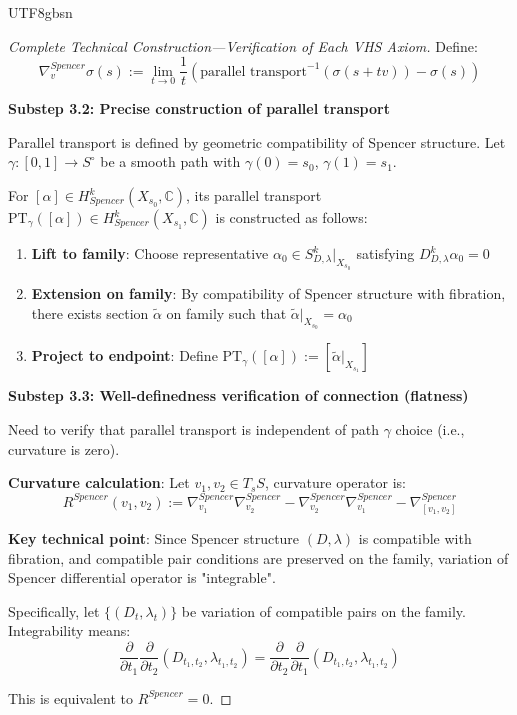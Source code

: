 \documentclass[a4paper,12pt]{extarticle}
\theoremstyle{definition}
\begin{document}
\begin{CJK}{UTF8}{gbsn}
\begin{proof}[Complete Technical Construction—Verification of Each VHS Axiom]
Define:
$$\nabla^{Spencer}_v \sigma(s) := \lim_{t \to 0} \frac{1}{t}\left(\text{parallel transport}^{-1}(\sigma(s+tv)) - \sigma(s)\right)$$

\textbf{Substep 3.2: Precise construction of parallel transport}

Parallel transport is defined by geometric compatibility of Spencer structure. Let $\gamma: [0,1] \to S^\circ$ be a smooth path with $\gamma(0) = s_0$, $\gamma(1) = s_1$.

For $[\alpha] \in H^k_{Spencer}(X_{s_0}, \mathbb{C})$, its parallel transport $\text{PT}_\gamma([\alpha]) \in H^k_{Spencer}(X_{s_1}, \mathbb{C})$ is constructed as follows:

\begin{enumerate}
    \item \textbf{Lift to family}: Choose representative $\alpha_0 \in S^k_{D,\lambda}|_{X_{s_0}}$ satisfying $D^k_{D,\lambda}\alpha_0 = 0$
    \item \textbf{Extension on family}: By compatibility of Spencer structure with fibration, there exists section $\tilde{\alpha}$ on family such that $\tilde{\alpha}|_{X_{s_0}} = \alpha_0$
    \item \textbf{Project to endpoint}: Define $\text{PT}_\gamma([\alpha]) := [\tilde{\alpha}|_{X_{s_1}}]$
\end{enumerate}

\textbf{Substep 3.3: Well-definedness verification of connection (flatness)}

Need to verify that parallel transport is independent of path $\gamma$ choice (i.e., curvature is zero).

\textbf{Curvature calculation}: Let $v_1, v_2 \in T_sS$, curvature operator is:
$$R^{Spencer}(v_1, v_2) := \nabla^{Spencer}_{v_1}\nabla^{Spencer}_{v_2} - \nabla^{Spencer}_{v_2}\nabla^{Spencer}_{v_1} - \nabla^{Spencer}_{[v_1, v_2]}$$

\textbf{Key technical point}: Since Spencer structure $(D,\lambda)$ is compatible with fibration, and compatible pair conditions are preserved on the family, variation of Spencer differential operator is "integrable".

Specifically, let $\{(D_t, \lambda_t)\}$ be variation of compatible pairs on the family. Integrability means:
$$\frac{\partial}{\partial t_1}\frac{\partial}{\partial t_2}(D_{t_1,t_2}, \lambda_{t_1,t_2}) = \frac{\partial}{\partial t_2}\frac{\partial}{\partial t_1}(D_{t_1,t_2}, \lambda_{t_1,t_2})$$

This is equivalent to $R^{Spencer} = 0$.


\end{proof}
\end{CJK}
\end{document}
